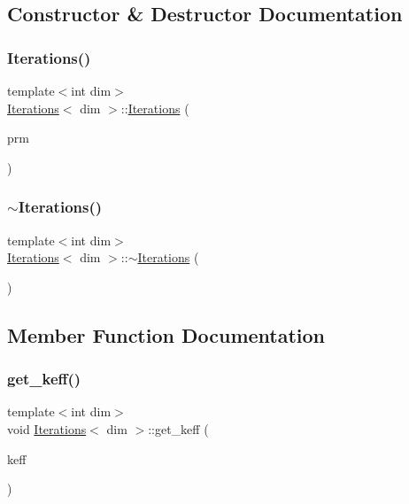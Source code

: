 \subsection{Constructor \& Destructor Documentation}
\mbox{\label{class_iterations_a0355678383cd174840beb772ce7e9e8d}} 
\subsubsection{\texorpdfstring{Iterations()}{Iterations()}}
{\footnotesize\ttfamily template$<$int dim$>$ \\
\hyperlink{class_iterations}{Iterations}$<$ dim $>$\+::\hyperlink{class_iterations}{Iterations} (\begin{DoxyParamCaption}\item[{const Parameter\+Handler \&}]{prm }\end{DoxyParamCaption})}

\mbox{\label{class_iterations_ae6ea082615afe8919000b4ea1465f9cf}} 
\subsubsection{\texorpdfstring{$\sim$\+Iterations()}{~Iterations()}}
{\footnotesize\ttfamily template$<$int dim$>$ \\
\hyperlink{class_iterations}{Iterations}$<$ dim $>$\+::$\sim$\hyperlink{class_iterations}{Iterations} (\begin{DoxyParamCaption}{ }\end{DoxyParamCaption})}



\subsection{Member Function Documentation}
\mbox{\label{class_iterations_ae80aa8efae880a81421502dfdf1a7466}} 
\subsubsection{\texorpdfstring{get\+\_\+keff()}{get\_keff()}}
{\footnotesize\ttfamily template$<$int dim$>$ \\
void \hyperlink{class_iterations}{Iterations}$<$ dim $>$\+::get\+\_\+keff (\begin{DoxyParamCaption}\item[{double \&}]{keff }\end{DoxyParamCaption})}

